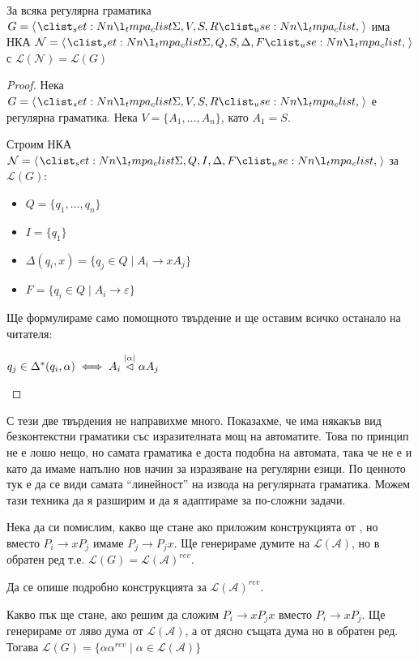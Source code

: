 \begin{claim}
    За всяка регулярна граматика $G = \opair{\Sigma, V, S, R}$ има НКА $\mathcal{N} = \opair{\Sigma, Q, S, \Delta, F}$ с $\mathcal{L(N)} = \mathcal{L}(G)$
\end{claim}

\begin{proof}
    Нека $G = \opair{\Sigma, V, S, R}$ е регулярна граматика.
    Нека $V = \{ A_1, \dots, A_n \}$, като $A_1 = S$.

    Строим НКА $\mathcal{N} = \opair{\Sigma, Q, I, \Delta, F}$ за $\mathcal{L}(G)$:
    \begin{itemize}
        \item $Q = \{ q_1, \dots, q_n \}$
        \item $I = \{ q_ 1 \} $
        \item $\Delta(q_i, x) = \{ q_j \in Q \mid A_i \rightarrow x A_j \}$
        \item $F = \{ q_i \in Q \mid A_i \rightarrow \varepsilon \}$
    \end{itemize}

    Ще формулираме само помощното твърдение и ще оставим всичко останало на читателя:
    \begin{center}
        $q_j \in \Delta^*(q_i, \alpha) \iff A_i \stackrel{|\alpha|}{\vartriangleleft} \alpha A_j$
    \end{center}
\end{proof}

С тези две твърдения не направихме много.
Показахме, че има някакъв вид безконтекстни граматики със изразителната мощ на автоматите.
Това по принцип не е лошо нещо, но самата граматика е доста подобна на автомата, така че не е и като да имаме напълно нов начин за изразяване на регулярни езици.
По ценното тук е да се види самата ``линейност'' на извода на регулярната граматика.
Можем тази техника да я разширим и да я адаптираме за по-сложни задачи.

Нека да си помислим, какво ще стане ако приложим конструкцията от , но вместо $P_i \rightarrow x P_j$ имаме $P_j \rightarrow P_j x$.
Ще генерираме думите на $\mathcal{L(A)}$, но в обратен ред т.е. $\mathcal{L}(G) = \mathcal{L(A)}^{rev}$.

\begin{problem}
Да се опише подробно конструкцията за $\mathcal{L(A)}^{rev}$.
\end{problem}

Какво пък ще стане, ако решим да сложим $P_i \rightarrow x P_j x$ вместо $P_i \rightarrow x P_j$.
Ще генерираме от ляво дума от $\mathcal{L(A)}$, а от дясно същата дума но в обратен ред.
Тогава $\mathcal{L}(G) = \{ \alpha \alpha^{rev} \mid \alpha \in \mathcal{L(A)} \}$

